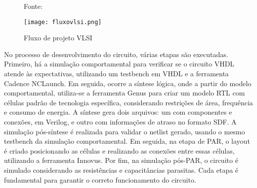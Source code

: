 \begin{figure}[ht!]
    \centering
    \captionsetup{justification=centering}
    \caption*{Fonte: \cite{CMOS2010}}
    \texttt{[image: fluxovlsi.png]}
    \caption{Fluxo de projeto VLSI}
    \label{fig:CMOS2010}
\end{figure}

No processo de desenvolvimento do circuito, várias etapas são executadas. Primeiro, há a simulação comportamental para verificar se o circuito VHDL atende às expectativas, utilizando um testbench em VHDL e a ferramenta Cadence NCLaunch. Em seguida, ocorre a síntese lógica, onde a partir do modelo comportamental, utiliza-se a ferramenta Genus para criar um modelo RTL com células padrão de tecnologia específica, considerando restrições de área, frequência e consumo de energia. A síntese gera dois arquivos: um com componentes e conexões, em Verilog, e outro com informações de atraso no formato SDF. A simulação pós-síntese é realizada para validar o netlist gerado, usando o mesmo testbench da simulação comportamental. Em seguida, na etapa de PAR, o layout é criado posicionando as células e realizando as conexões entre essas células, utilizando a ferramenta Innovus. Por fim, na simulação pós-PAR, o circuito é simulado considerando as resistências e capacitâncias parasitas. Cada etapa é fundamental para garantir o correto funcionamento do circuito.